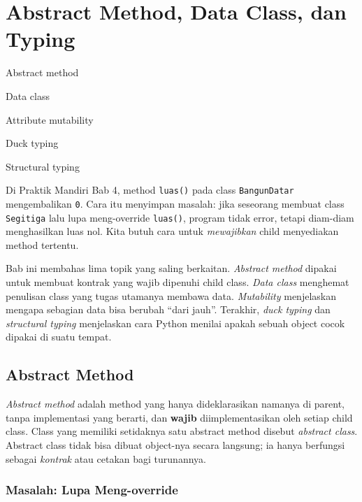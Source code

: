 \chapter{Abstract Method, Data Class, dan Typing}

\begin{dibabini}
  \item Abstract method
  \item Data class
  \item Attribute mutability
  \item Duck typing
  \item Structural typing
\end{dibabini}

Di Praktik Mandiri Bab 4, method \texttt{luas()} pada class \texttt{BangunDatar} mengembalikan \texttt{0}. Cara itu menyimpan masalah: jika seseorang membuat class \texttt{Segitiga} lalu lupa meng-override \texttt{luas()}, program tidak error, tetapi diam-diam menghasilkan luas nol. Kita butuh cara untuk \emph{mewajibkan} child menyediakan method tertentu.

Bab ini membahas lima topik yang saling berkaitan. \emph{Abstract method} dipakai untuk membuat kontrak yang wajib dipenuhi child class. \emph{Data class} menghemat penulisan class yang tugas utamanya membawa data. \emph{Mutability} menjelaskan mengapa sebagian data bisa berubah ``dari jauh''. Terakhir, \emph{duck typing} dan \emph{structural typing} menjelaskan cara Python menilai apakah sebuah object cocok dipakai di suatu tempat.

\section{Abstract Method}

\emph{Abstract method} adalah method yang hanya dideklarasikan namanya di parent, tanpa implementasi yang berarti, dan \textbf{wajib} diimplementasikan oleh setiap child class. Class yang memiliki setidaknya satu abstract method disebut \emph{abstract class}. Abstract class tidak bisa dibuat object-nya secara langsung; ia hanya berfungsi sebagai \emph{kontrak} atau cetakan bagi turunannya.

\subsection{Masalah: Lupa Meng-override}

